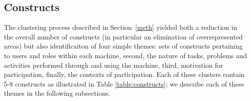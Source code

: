 \documentclass{sig-alternate}
\begin{document}
\subsection{Constructs}

The clustering process described in Section~\ref{meth} yielded both a
reduction in the overall number of constructs (in particular an
elimination of overrepresented areas) but also identificaiton of four
simple themes: sets of constructs pertaining to users and roles within
each machine, second, the nature of tasks, problems and activities
performed through and using the machine, third, motivation for
participation, finally, the contexts of participation.  Each of these
clusters contain 5-8 constructs as illustrated in Table
\ref{table:constructs}; we describe each of these themes in the
following subsections.
\end{document}
